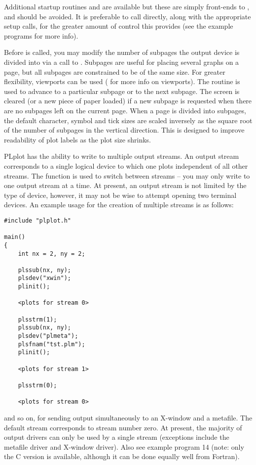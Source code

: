 Additional startup routines  and  are available
but these are simply front-ends to , and should be avoided.
It is preferable to call  directly, along with the
appropriate setup calls, for the greater amount of control this
provides (see the example programs for more info).

Before  is called, you may modify the number of subpages
the output device is divided into via a call to .  Subpages
are useful for placing several graphs on a page, but all subpages are
constrained to be of the same size.  For greater flexibility, viewports
can be used ( for more info on viewports).  The routine
 is used to advance to a particular subpage or to the next
subpage.  The screen is cleared (or a new piece of paper loaded) if a
new subpage is requested when there are no subpages left on the current
page.  When a page is divided into subpages, the default character,
symbol and tick sizes are scaled inversely as the square root of the
number of subpages in the vertical direction.  This is designed to
improve readability of plot labels as the plot size shrinks.

PLplot has the ability to write to multiple output streams.  An output
stream corresponds to a single logical device to which one plots
independent of all other streams.  The function  is used to
switch between streams -- you may only write to one output stream at
a time.  At present, an output stream is not limited by the type of
device, however, it may not be wise to attempt opening two terminal
devices.  An example usage for the creation of multiple streams is as
follows:

\begin{verbatim}
#include "plplot.h"

main()
{
    int nx = 2, ny = 2;

    plssub(nx, ny);
    plsdev("xwin");
    plinit();

    <plots for stream 0>

    plsstrm(1);
    plssub(nx, ny);
    plsdev("plmeta");
    plsfnam("tst.plm");
    plinit();

    <plots for stream 1>

    plsstrm(0);

    <plots for stream 0>
\end{verbatim}

and so on, for sending output simultaneously to an X-window and a metafile.
The default stream corresponds to stream number zero.  At present, the
majority of output drivers can only be used by a single stream
(exceptions include the metafile driver and X-window driver).  Also see
example program 14 (note: only the C version is available, although it
can be done equally well from Fortran).

